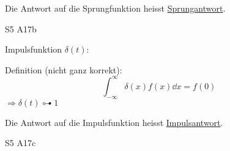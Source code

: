 Die Antwort auf die Sprungfunktion heisst \underline{Sprungantwort}.

 S5 A17b

Impulsfunktion $\delta(t)$:
\begin{center}
\end{center}
Definition (nicht ganz korrekt):
\begin{equation*}
    \int _{-\infty}^{\infty} \delta(x)f(x) \dd{x} = f(0)
\end{equation*}
$\Rightarrow \delta(t) \multimapdotbothA 1$ 

Die Antwort auf die Impulsfunktion heisst \underline{Impulsantwort}.

 S5 A17c
